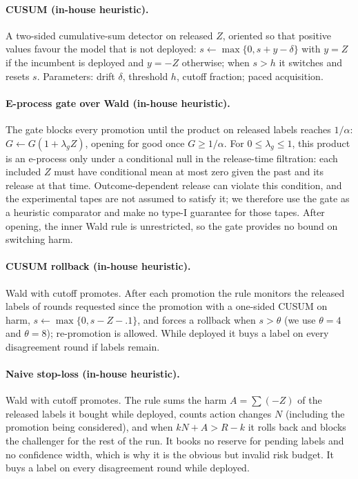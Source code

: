 \documentclass[10pt]{article}
\theoremstyle{plain}
\theoremstyle{definition}
\begin{document}
\paragraph{CUSUM (in-house heuristic).}
A two-sided cumulative-sum detector on released $Z$, oriented so that positive values favour the model that is not deployed: $s\leftarrow\max\{0,s+y-\delta\}$ with $y=Z$ if the incumbent is deployed and $y=-Z$ otherwise; when $s>h$ it switches and resets $s$. Parameters: drift $\delta$, threshold $h$, cutoff fraction; paced acquisition.

\paragraph{E-process gate over Wald (in-house heuristic).}
The gate blocks every promotion until the product on released labels reaches $1/\alpha$: $G\leftarrow G(1+\lambda_gZ)$, opening for good once $G\ge1/\alpha$. For $0\le\lambda_g\le1$, this product is an e-process only under a conditional null in the release-time filtration: each included $Z$ must have conditional mean at most zero given the past and its release at that time. Outcome-dependent release can violate this condition, and the experimental tapes are not assumed to satisfy it; we therefore use the gate as a heuristic comparator and make no type-I guarantee for those tapes. After opening, the inner Wald rule is unrestricted, so the gate provides no bound on switching harm.

\paragraph{CUSUM rollback (in-house heuristic).}
Wald with cutoff promotes. After each promotion the rule monitors the released labels of rounds requested since the promotion with a one-sided CUSUM on harm, $s\leftarrow\max\{0,s-Z-.1\}$, and forces a rollback when $s>\theta$ (we use $\theta=4$ and $\theta=8$); re-promotion is allowed. While deployed it buys a label on every disagreement round if labels remain.

\paragraph{Naive stop-loss (in-house heuristic).}
Wald with cutoff promotes. The rule sums the harm $A=\sum(-Z)$ of the released labels it bought while deployed, counts action changes $N$ (including the promotion being considered), and when $kN+A>R-k$ it rolls back and blocks the challenger for the rest of the run. It books no reserve for pending labels and no confidence width, which is why it is the obvious but invalid risk budget. It buys a label on every disagreement round while deployed.
\end{document}
